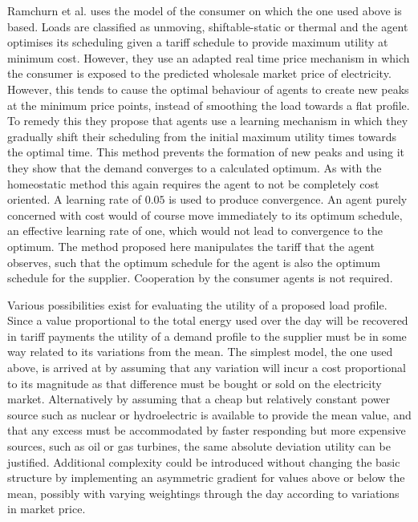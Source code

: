 \documentclass[a4paper, 10 pt, conference]{ieeeconf}  %
\begin{document}
Ramchurn et al. \cite{ramchurn2011agent} uses the model of the consumer on which the one used above is based. Loads are classified as unmoving, shiftable-static or thermal and the agent optimises its scheduling given a tariff schedule to provide maximum utility at minimum cost. However, they use an adapted real time price mechanism in which the consumer is exposed to the predicted wholesale market price of electricity. However, this tends to cause the optimal behaviour of agents to create new peaks at the minimum price points, instead of smoothing the load towards a flat profile. To remedy this they propose that agents use a learning mechanism in which they gradually shift their scheduling from the initial maximum utility times towards the optimal time. This method prevents the formation of new peaks and using it they show that the demand converges to a calculated optimum. As with the homeostatic method this again requires the agent to not be completely cost oriented. A learning rate of $0.05$ is used to produce convergence. An agent purely concerned with cost would of course move immediately to its optimum schedule, an effective learning rate of one, which would not lead to convergence to the optimum. The method proposed here manipulates the tariff that the agent observes, such that the optimum schedule for the agent is also the optimum schedule for the supplier. Cooperation by the consumer agents is not required.

Various possibilities exist for evaluating the utility of a proposed load profile. Since a value proportional to the total energy used over the day will be recovered in tariff payments the utility of a demand profile to the supplier must be in some way related to its variations from the mean. The simplest model, the one used above, is arrived at by assuming that any variation will incur a cost proportional to its magnitude as that difference must be bought or sold on the electricity market. Alternatively by assuming that a cheap but relatively constant power source such as nuclear or hydroelectric is available to provide the mean value, and that any excess must be accommodated by faster responding but more expensive sources, such as oil or gas turbines, the same absolute deviation utility can be justified. Additional complexity could be introduced without changing the basic structure by implementing an asymmetric gradient for values above or below the mean, possibly with varying weightings through the day according to variations in market price.
\end{document}
